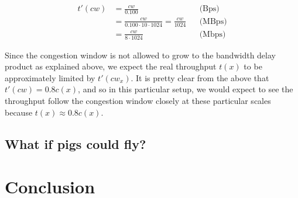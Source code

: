 \documentclass[12pt,a4paper]{article}
\begin{document}
\begin{align*}
  t'(cw) &= \frac{cw}{0.100}                       &&\text{(Bps)} \\
         &= \frac{cw}{0.100 \cdot 10 \cdot 1024}
          = \frac{cw}{1024}                        &&\text{(MBps)} \\
         &= \frac{cw}{8 \cdot 1024}                &&\text{(Mbps)}
\end{align*}

Since the congestion window is not allowed to grow to the bandwidth delay
product as explained above, we expect the real throughput $t(x)$ to be
approximately limited by $t'(cw_x)$. It is pretty clear from the above that
$t'(cw) = 0.8 c(x)$, and so in this particular setup, we would expect to
see the throughput follow the congestion window closely at these particular
scales because $t(x) \approx 0.8 c(x)$.

\subsection{What if pigs could fly?} %

\section{Conclusion}

%
\end{document}
